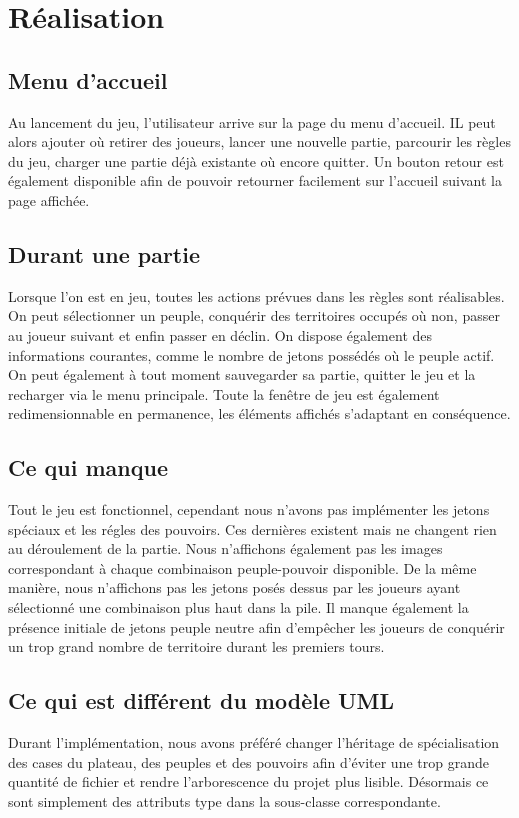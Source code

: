 \documentclass[a4paper]{report}
\begin{document}
\chapter{Réalisation}
\section{Menu d'accueil}
\par
Au lancement du jeu, l'utilisateur arrive sur la page du menu d'accueil. IL peut alors ajouter où retirer des joueurs, lancer une nouvelle partie, parcourir les règles du jeu, charger une partie déjà existante où encore quitter. Un bouton retour est également disponible afin de pouvoir retourner facilement sur l'accueil suivant la page affichée.
\section{Durant une partie}
\par
Lorsque l'on est en jeu, toutes les actions prévues dans les règles sont réalisables. On peut sélectionner un peuple, conquérir des territoires occupés où non, passer au joueur suivant et enfin passer en déclin. On dispose également des informations courantes, comme le nombre de jetons possédés où le peuple actif. On peut également à tout moment sauvegarder sa partie, quitter le jeu et la recharger via le menu principale. Toute la fenêtre de jeu est également redimensionnable en permanence, les éléments affichés s'adaptant en conséquence.
\section{Ce qui manque}
\par
Tout le jeu est fonctionnel, cependant nous n'avons pas implémenter les jetons spéciaux et les régles des pouvoirs. Ces dernières existent mais ne changent rien au déroulement de la partie. Nous n'affichons également pas les images correspondant à chaque combinaison peuple-pouvoir disponible. De la même manière, nous n'affichons pas les jetons posés dessus par les joueurs ayant sélectionné une combinaison plus haut dans la pile. Il manque également la présence initiale de jetons peuple neutre afin d'empêcher les joueurs de conquérir un trop grand nombre de territoire durant les premiers tours.
\section{Ce qui est différent du modèle UML}
\par
Durant l'implémentation, nous avons préféré changer l'héritage de spécialisation des cases du plateau, des peuples et des pouvoirs afin d'éviter une trop grande quantité de fichier et rendre l'arborescence du projet plus lisible. Désormais ce sont simplement des attributs type dans la sous-classe correspondante.
\end{document}
